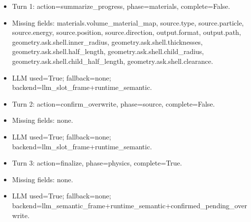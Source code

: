 \documentclass[11pt]{ctexart}
\begin{document}
\begin{itemize}
\item Turn 1: action=summarize\_progress, phase=materials, complete=False.
\item Missing fields: materials.volume\_material\_map, source.type, source.particle, source.energy, source.position, source.direction, output.format, output.path, geometry.ask.shell.inner\_radius, geometry.ask.shell.thicknesses, geometry.ask.shell.half\_length, geometry.ask.shell.child\_radius, geometry.ask.shell.child\_half\_length, geometry.ask.shell.clearance.
\item LLM used=True; fallback=none; backend=llm\_slot\_frame+runtime\_semantic.
\item Turn 2: action=confirm\_overwrite, phase=source, complete=False.
\item Missing fields: none.
\item LLM used=True; fallback=none; backend=llm\_slot\_frame+runtime\_semantic.
\item Turn 3: action=finalize, phase=physics, complete=True.
\item Missing fields: none.
\item LLM used=True; fallback=none; backend=llm\_semantic\_frame+runtime\_semantic+confirmed\_pending\_overwrite.
\end{itemize}
\end{document}
